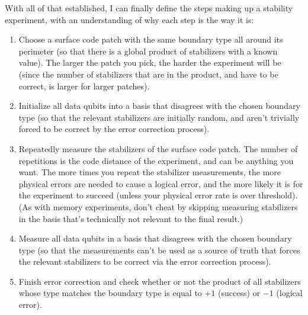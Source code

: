 \documentclass[onecolumn,unpublished,a4paper]{quantumarticle}
\theoremstyle{definition}
\theoremstyle{definition}
\theoremstyle{definition}
\begin{document}
With all of that established, I can finally define the steps making up a stability experiment, with an understanding of why each step is the way it is:

\begin{enumerate}

\item Choose a surface code patch with the same boundary type all around its perimeter (so that there is a global product of stabilizers with a known value).
The larger the patch you pick, the harder the experiment will be (since the number of stabilizers that are in the product, and have to  be correct, is larger for larger patches).

\item Initialize all data qubits into a basis that disagrees with the chosen boundary type (so that the relevant stabilizers are initially random, and aren't trivially forced to be correct by the error correction process).

\item Repeatedly measure the stabilizers of the surface code patch.
The number of repetitions is the code distance of the experiment, and can be anything you want.
The more times you repeat the stabilizer measurements, the more physical errors are needed to cause a logical error, and the more likely it is for the experiment to succeed (unless your physical error rate is over threshold).
(As with memory experiments, don't cheat by skipping measuring stabilizers in the basis that's technically not relevant to the final result.)

\item Measure all data qubits in a basis that disagrees with the chosen boundary type (so that the measurements can't be used as a source of truth that forces the relevant stabilizers to be correct via the error correction process).

\item Finish error correction and check whether or not the product of all stabilizers whose type matches the boundary type is equal to $+1$ (success) or $-1$ (logical error).

\end{enumerate}
\end{document}
